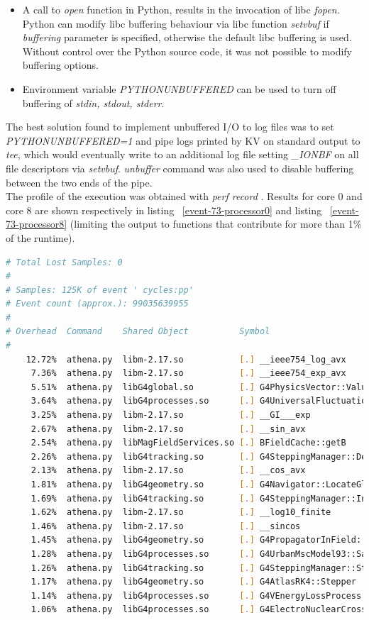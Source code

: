 \documentclass[a4paper]{jpconf}
\begin{document}
\begin{itemize}
\item A call to \textit{open} function in Python, results in the invocation
of libc \textit{fopen}. Python can modify libc buffering behaviour via libc 
function \textit{setvbuf} if \textit{buffering} parameter is specified, 
otherwise the default libc buffering is used. Without control over the Python
source code, it was not possible to modify buffering options.
\item Environment variable \textit{PYTHONUNBUFFERED} can be used to turn off
buffering of \textit{stdin, stdout, stderr}.
\end{itemize}
The best solution found to implement unbuffered I/O to log files was to set 
\textit{PYTHONUNBUFFERED=1} and pipe logs printed by KV on standard output to
\textit{tee}, which would eventually write to an additional log file setting 
\textit{\_IONBF} on all file descriptors via \textit{setvbuf}.
\textit{unbuffer} command was also used to disable buffering between the two
ends of the pipe. 
\\
The profile of the execution was obtained with \textit{perf record} . 
Results for core 0 
and core 8 are shown respectively in listing ~\ref{event-73-processor0} and 
listing ~\ref{event-73-processor8} (limiting the output to functions that
contribute for more than 1\% of the runtime). 

\begin{lstlisting}[language=Bash,float,caption=Recording of event 73 on core 0, label=event-73-processor0]
# Total Lost Samples: 0
#
# Samples: 125K of event ' cycles:pp'
# Event count (approx.): 99035639955
#
# Overhead  Command    Shared Object          Symbol                                            
#
    12.72%  athena.py  libm-2.17.so           [.] __ieee754_log_avx
     7.36%  athena.py  libm-2.17.so           [.] __ieee754_exp_avx
     5.51%  athena.py  libG4global.so         [.] G4PhysicsVector::Value
     3.64%  athena.py  libG4processes.so      [.] G4UniversalFluctuation::SampleFluctuations
     3.25%  athena.py  libm-2.17.so           [.] __GI___exp
     2.67%  athena.py  libm-2.17.so           [.] __sin_avx
     2.54%  athena.py  libMagFieldServices.so [.] BFieldCache::getB
     2.26%  athena.py  libG4tracking.so       [.] G4SteppingManager::DefinePhysicalStepLength
     2.13%  athena.py  libm-2.17.so           [.] __cos_avx
     1.81%  athena.py  libG4geometry.so       [.] G4Navigator::LocateGlobalPointWithinVolume
     1.69%  athena.py  libG4tracking.so       [.] G4SteppingManager::InvokePSDIP
     1.62%  athena.py  libm-2.17.so           [.] __log10_finite
     1.46%  athena.py  libm-2.17.so           [.] __sincos
     1.45%  athena.py  libG4geometry.so       [.] G4PropagatorInField::ComputeStep
     1.28%  athena.py  libG4processes.so      [.] G4UrbanMscModel93::SampleCosineTheta
     1.26%  athena.py  libG4tracking.so       [.] G4SteppingManager::Stepping
     1.17%  athena.py  libG4geometry.so       [.] G4AtlasRK4::Stepper
     1.14%  athena.py  libG4processes.so      [.] G4VEnergyLossProcess::PostStepGetPhysicalInter
     1.06%  athena.py  libG4processes.so      [.] G4ElectroNuclearCrossSection::GetZandACrossSec
\end{lstlisting}
\end{document}
